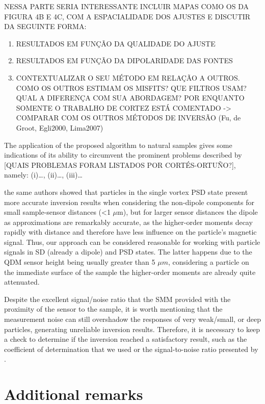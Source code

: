 NESSA PARTE SERIA INTERESSANTE INCLUIR MAPAS COMO OS DA FIGURA 4B E 4C, COM A
ESPACIALIDADE DOS AJUSTES E DISCUTIR DA SEGUINTE FORMA:

\begin{enumerate}
\item RESULTADOS EM FUNÇÃO DA QUALIDADE DO AJUSTE
\item RESULTADOS EM FUNÇÃO DA DIPOLARIDADE DAS FONTES
\item CONTEXTUALIZAR O SEU MÉTODO EM RELAÇÃO A OUTROS. COMO OS OUTROS ESTIMAM
  OS MISFITS? QUE FILTROS USAM? QUAL A DIFERENÇA COM SUA ABORDAGEM? POR
  ENQUANTO SOMENTE O TRABALHO DE CORTEZ ESTÁ COMENTADO -> COMPARAR COM
  OS OUTROS MÉTODOS DE INVERSÃO (Fu, de Groot, Egli2000, Lima2007)
\end{enumerate}

The application of the proposed algorithm to natural samples gives some
indications of its ability to circumvent the prominent problems described by
\citep{CortesOrtuno2022} [QUAIS PROBLEMAS FORAM LISTADOS POR CORTÉS-ORTUÑO?],
namely: (i)\dots, (ii)\dots, (iii)\dots

the same authors showed that particles in the single vortex PSD state present
more accurate inversion results when considering the non-dipole components for
small sample-sensor distances (\textless 1 $\mu$m), but for larger sensor
distances the dipole as approximations are remarkably accurate, as the
higher-order moments decay rapidly with distance and therefore have less
influence on the particle's magnetic signal. Thus, our approach can be
considered reasonable for working with particle signals in SD (already a
dipole) and PSD states. The latter happens due to the QDM sensor height being
usually greater than 5 $\mu m$, considering a particle on the immediate
surface of the sample the higher-order moments are already quite attenuated.

Despite the excellent signal/noise ratio that the SMM provided with the
proximity of the sensor to the sample, it is worth mentioning that the
measurement noise can still overshadow the responses of very weak/small, or
deep particles, generating unreliable inversion results. Therefore, it is
necessary to keep a check to determine if the inversion reached a satisfactory
result, such as the coefficient of determination that we used or the
signal-to-noise ratio presented by \citep{CortesOrtuno2022}.


\section{Additional remarks}

